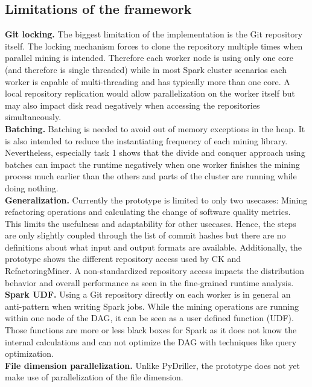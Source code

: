 \subsection{Limitations of the framework}
\textbf{Git locking.} The biggest limitation of the \iris implementation is the Git repository itself. The locking mechanism forces to clone the repository multiple times when parallel mining is intended. Therefore each worker node is using only one core (and therefore is single threaded) while in most Spark cluster scenarios each worker is capable of multi-threading and has typically more than one core. A local repository replication would allow parallelization on the worker itself but may also impact disk read negatively when accessing the repositories simultaneously. \\
\textbf{Batching.} Batching is needed to avoid out of memory exceptions in the heap. It is also intended to reduce the instantiating frequency of each mining library. Nevertheless, especially task 1 shows that the divide and conquer approach using batches can impact the runtime negatively when one worker finishes the mining process much earlier than the others and parts of the cluster are running while doing nothing.\\
\textbf{Generalization.} Currently the prototype is limited to only two usecases: Mining refactoring operations and calculating the change of software quality metrics. This limits the usefulness and adaptability for other usecases. Hence, the steps are only slightly coupled through the list of commit hashes but there are no definitions about what input and output formats are available. Additionally, the prototype shows the different repository access used by CK and RefactoringMiner. A non-standardized repository access impacts the distribution behavior and overall performance as seen in the fine-grained runtime analysis.\\
\textbf{Spark UDF.} Using a Git repository directly on each worker is in general an anti-pattern when writing Spark jobs. While the mining operations are running within one node of the DAG, it can be seen as a user defined function (UDF). Those functions are more or less black boxes for Spark as it does not know the internal calculations and can not optimize the DAG with techniques like query optimization.\\
\textbf{File dimension parallelization.} Unlike PyDriller, the prototype does not yet make use of parallelization of the file dimension.
\label{sec:limitations}
